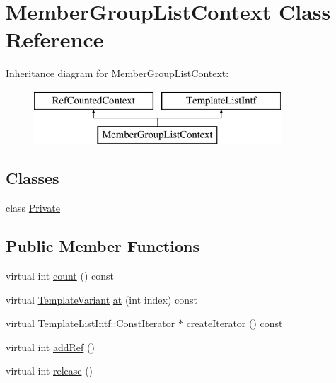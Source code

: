 \hypertarget{class_member_group_list_context}{}\section{Member\+Group\+List\+Context Class Reference}
\label{class_member_group_list_context}
Inheritance diagram for Member\+Group\+List\+Context\+:\begin{figure}[H]
\begin{center}
\leavevmode
\includegraphics[height=2.000000cm]{class_member_group_list_context}
\end{center}
\end{figure}
\subsection*{Classes}
\begin{DoxyCompactItemize}
\item 
class \mbox{\hyperlink{class_member_group_list_context_1_1_private}{Private}}
\end{DoxyCompactItemize}
\subsection*{Public Member Functions}
\begin{DoxyCompactItemize}
\item 
virtual int \mbox{\hyperlink{class_member_group_list_context_a65ff4ee1ee899eabe742616a5ccf7648}{count}} () const
\item 
virtual \mbox{\hyperlink{class_template_variant}{Template\+Variant}} \mbox{\hyperlink{class_member_group_list_context_a804c6afa443fa52659d4f19413f329bf}{at}} (int index) const
\item 
virtual \mbox{\hyperlink{class_template_list_intf_1_1_const_iterator}{Template\+List\+Intf\+::\+Const\+Iterator}} $\ast$ \mbox{\hyperlink{class_member_group_list_context_abc6f782dc3c8e8ed377d151805b3abbe}{create\+Iterator}} () const
\item 
virtual int \mbox{\hyperlink{class_member_group_list_context_a3a135dbacc0e65f809b61797db5dbc4a}{add\+Ref}} ()
\item 
virtual int \mbox{\hyperlink{class_member_group_list_context_afc46c3c1646126f13c4357c4800a5fe0}{release}} ()
\end{DoxyCompactItemize}
